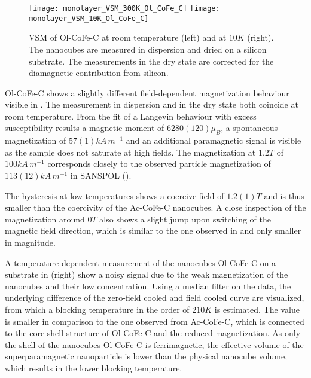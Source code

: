 \documentclass[\main/dresen_thesis.tex]{subfiles}
\begin{document}
  \begin{figure}[tb]
    \centering
    \texttt{[image: monolayer\_VSM\_300K\_Ol\_CoFe\_C]}
    \texttt{[image: monolayer\_VSM\_10K\_Ol\_CoFe\_C]}
    \caption{\label{fig:monolayers:nanoparticle:vsmOlCoFeC}VSM of Ol-CoFe-C at room temperature (left) and at $10 \unit{K}$ (right). The nanocubes are measured in dispersion and dried on a silicon substrate. The measurements in the dry state are corrected for the diamagnetic contribution from silicon.}
  \end{figure}

  Ol-CoFe-C shows a slightly different field-dependent magnetization behaviour visible in .
  The measurement in dispersion and in the dry state both coincide at room temperature.
  From the fit of a Langevin behaviour with excess susceptibility results a magnetic moment of $6280(120) \mu_B$, a spontaneous magnetization of $57(1) \unit{kA \, m^{-1}}$ and an additional paramagnetic signal is visible as the sample does not saturate at high fields.
  The magnetization at $1.2 \unit{T}$ of $100 \unit{kA \, m^{-1}}$ corresponds closely to the observed particle magnetization of $113(12)\unit{kA \, m^{-1}}$ in SANSPOL ().

  The hysteresis at low temperatures shows a coercive field of $1.2(1) \unit{T}$ and is thus smaller than the coercivity of the Ac-CoFe-C nanocubes.
  A close inspection of the magnetization around $0 \unit{T}$ also shows a slight jump upon switching of the magnetic field direction, which is similar to the one observed in  and only smaller in magnitude.

  A temperature dependent measurement of the nanocubes Ol-CoFe-C on a substrate in  (right) show a noisy signal due to the weak magnetization of the nanocubes and their low concentration.
  Using a median filter on the data, the underlying difference of the zero-field cooled and field cooled curve are visualized, from which a blocking temperature in the order of $210 \unit{K}$ is estimated.
  The value is smaller in comparison to the one observed from Ac-CoFe-C, which is connected to the core-shell structure of Ol-CoFe-C and the reduced magnetization.
  As only the shell of the nanocubes Ol-CoFe-C is ferrimagnetic, the effective volume of the superparamagnetic nanoparticle is lower than the physical nanocube volume, which results in the lower blocking temperature.
\end{document}
